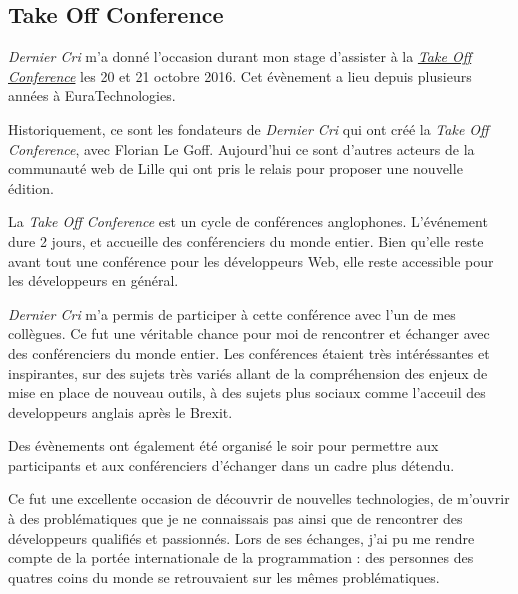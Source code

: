 \documentclass[12pt,a4paper]{article}
\begin{document}
  \bigskip

  \subsection{Take Off Conference}\label{take-off-conference}

  \bigskip

  \emph{Dernier Cri} m'a donné l'occasion durant mon stage d'assister à la
  \href{http://takeoffconf.com/2016}{\emph{Take Off Conference}} les 20 et
  21 octobre 2016. Cet évènement a lieu depuis plusieurs années à
  EuraTechnologies.

  \bigskip

  Historiquement, ce sont les fondateurs de \emph{Dernier Cri} qui ont
  créé la \emph{Take Off Conference}, avec Florian Le Goff. Aujourd'hui ce
  sont d'autres acteurs de la communauté web de Lille qui ont pris le
  relais pour proposer une nouvelle édition.

  \bigskip

  La \emph{Take Off Conference} est un cycle de conférences anglophones.
  L'événement dure 2 jours, et accueille des conférenciers du monde
  entier. Bien qu'elle reste avant tout une conférence pour les
  développeurs Web, elle reste accessible pour les développeurs en
  général.

  \bigskip

  \emph{Dernier Cri} m'a permis de participer à cette conférence avec l'un
  de mes collègues. Ce fut une véritable chance pour moi de rencontrer et
  échanger avec des conférenciers du monde entier. Les conférences étaient
  très intéréssantes et inspirantes, sur des sujets très variés allant de
  la compréhension des enjeux de mise en place de nouveau outils, à des
  sujets plus sociaux comme l'acceuil des developpeurs anglais après le
  Brexit.

  \bigskip

  Des évènements ont également été organisé le soir pour permettre aux
  participants et aux conférenciers d'échanger dans un cadre plus détendu.

  \bigskip

  Ce fut une excellente occasion de découvrir de nouvelles technologies,
  de m'ouvrir à des problématiques que je ne connaissais pas ainsi que de
  rencontrer des développeurs qualifiés et passionnés. Lors de ses
  échanges, j'ai pu me rendre compte de la portée internationale de la
  programmation : des personnes des quatres coins du monde se retrouvaient
  sur les mêmes problématiques.
\end{document}
